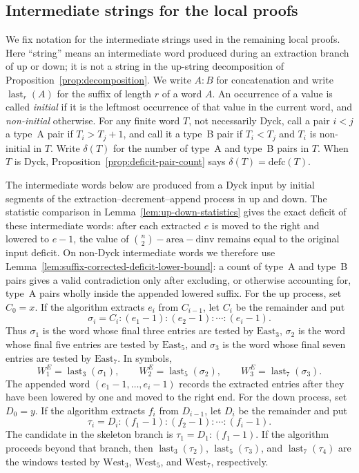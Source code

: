 \documentclass[11pt]{article}
\theoremstyle{plain}
\theoremstyle{definition}
\theoremstyle{remark}
\newcommand{\dinv}{\mathrm{dinv}}
\newcommand{\area}{\mathrm{area}}
\newcommand{\defc}{\mathrm{defc}}
\begin{document}
\subsection{Intermediate strings for the local proofs}
\label{subsec:local-proof-strings}
We fix notation for the intermediate strings used in the remaining local
proofs.  Here ``string'' means an intermediate word produced during an extraction
branch of \(\mathrm{up}\) or \(\mathrm{down}\); it is not a string in the
\(\mathrm{up}\)-string decomposition of Proposition~\ref{prop:decomposition}.
We write \(A:B\) for concatenation and write \(\operatorname{last}_r(A)\) for
the suffix of length \(r\) of a word \(A\).
An occurrence of a value is called \emph{initial} if it is the leftmost
occurrence of that value in the current word, and \emph{non-initial} otherwise.
For any finite word \(T\), not necessarily Dyck, call a pair \(i<j\) a type~A
pair if \(T_i>T_j+1\), and call it a type~B pair if \(T_i<T_j\) and \(T_i\)
is non-initial in \(T\).  Write \(\delta(T)\) for the number of type~A and
type~B pairs in \(T\).  When \(T\) is Dyck,
Proposition~\ref{prop:deficit-pair-count} says \(\delta(T)=\defc(T)\).

The intermediate words below are produced from a Dyck input by initial segments
of the extraction--decrement--append process in \(\mathrm{up}\) and
\(\mathrm{down}\).  The statistic comparison in
Lemma~\ref{lem:up-down-statistics} gives the exact deficit of these
intermediate words: after each extracted \(e\) is moved to the right and
lowered to \(e-1\), the value of
\(\binom n2-\area-\dinv\) remains equal to the original input deficit.  On
non-Dyck intermediate words we therefore use
Lemma~\ref{lem:suffix-corrected-deficit-lower-bound}: a count of type~A and
type~B pairs gives a valid contradiction only after excluding, or otherwise
accounting for, type~A pairs wholly inside the appended lowered suffix.
For the \(\mathrm{up}\) process, set \(C_0=x\).  If the algorithm extracts
\(e_i\) from \(C_{i-1}\), let \(C_i\) be the remainder and put
\[
  \sigma_i=C_i:(e_1-1):(e_2-1):\cdots:(e_i-1).
\]
Thus \(\sigma_1\) is the word whose final three entries are tested by
\(\mathrm{East}_3\), \(\sigma_2\) is the word whose final five entries are
tested by \(\mathrm{East}_5\), and \(\sigma_3\) is the word whose final seven
entries are tested by \(\mathrm{East}_7\).  In symbols,
\[
  W^E_1=\operatorname{last}_3(\sigma_1),\qquad
  W^E_2=\operatorname{last}_5(\sigma_2),\qquad
  W^E_3=\operatorname{last}_7(\sigma_3).
\]
The appended word \((e_1-1,\ldots,e_i-1)\) records the extracted entries after
they have been lowered by one and moved to the right end.
For the \(\mathrm{down}\) process, set \(D_0=y\).  If the algorithm extracts
\(f_i\) from \(D_{i-1}\), let \(D_i\) be the remainder and put
\[
  \tau_i=D_i:(f_1-1):(f_2-1):\cdots:(f_i-1).
\]
The candidate in the skeleton branch is \(\tau_1=D_1:(f_1-1)\).  If the
algorithm proceeds beyond that branch, then \(\operatorname{last}_3(\tau_2)\),
\(\operatorname{last}_5(\tau_3)\), and \(\operatorname{last}_7(\tau_4)\) are
the windows tested by \(\mathrm{West}_3\), \(\mathrm{West}_5\), and
\(\mathrm{West}_7\), respectively.
\end{document}
